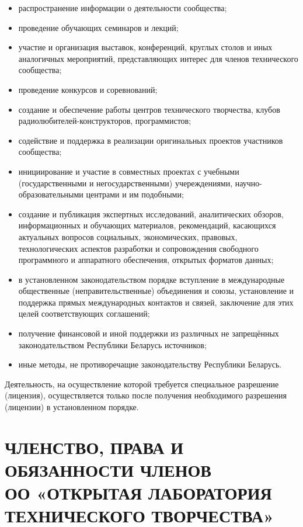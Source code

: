 \documentclass[a4paper,fontsize=14pt,titlepage]{scrartcl}
\newcommand{\OOname}{«Открытая лаборатория технического творчества»}
\newcommand{\OONAME}{«ОТКРЫТАЯ ЛАБОРАТОРИЯ ТЕХНИЧЕСКОГО ТВОРЧЕСТВА»}
\newcommand{\OO}{ОО \OOname}
\begin{document}
\begin{itemize}
\item распространение информации о деятельности сообщества;
\item проведение обучающих семинаров и лекций;
\item участие и организация выставок, конференций, круглых столов и иных аналогичных мероприятий, представляющих интерес для
членов технического сообщества;
\item проведение конкурсов и соревнований;
\item создание и обеспечение работы центров технического творчества, клубов радиолюбителей-конструкторов, программистов;
\item содействие и поддержка в реализации оригинальных проектов участников сообщества;
\item инициирование и участие в совместных проектах с учебными (государственными и негосударственными) учереждениями,
научно-образовательными центрами и им подобными;
\item создание и публикация экспертных исследований, аналитических обзоров,
информационных и обучающих материалов, рекомендаций, касающихся актуальных вопросов социальных,
экономических, правовых, технологических аспектов разработки и сопровождения свободного программного и аппаратного обеспечения,
открытых форматов данных;
\item в установленном законодательством порядке вступление в международные общественные (неправительственные) объединения и
союзы, установление и поддержка прямых международных контактов и связей, заключение для этих целей соответствующих
соглашений;
\item получение финансовой и иной поддержки из различных не запрещённых законодательством Республики Беларусь источников;
\item иные методы, не противоречащие законодательству Республики Беларусь.
\end{itemize}
Деятельность, на осуществление которой требуется специальное разрешение (лицензия),
осуществляется только после получения необходимого разрешения (лицензии) в установленном порядке.




\newpage\section{ЧЛЕНСТВО, ПРАВА И ОБЯЗАННОСТИ ЧЛЕНОВ\\ ОО \OONAME}
\end{document}
